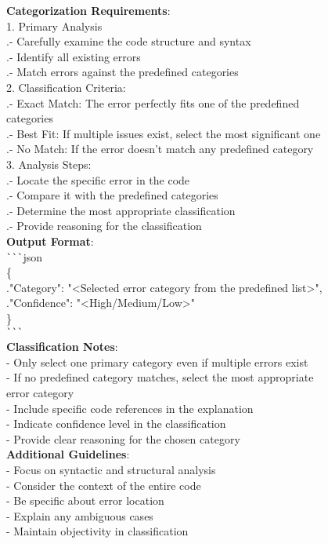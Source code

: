\documentclass[11pt, a4paper, logo, copyright, nonumbering, amsart]{map}
\begin{document}
\begin{CJK*}{UTF8}{gbsn}
\begin{figure*}[h!]
\begin{center}
\begin{tcolorbox}[width=1\textwidth, colback=lightblue, title={\textbf{Identifying Programming Error Types Prompt}}]
    \textbf{Categorization Requirements}:\\
    1. Primary Analysis\\
       .\quad- Carefully examine the code structure and syntax\\
       .\quad- Identify all existing errors\\
       .\quad- Match errors against the predefined categories\\
    2. Classification Criteria:\\
       .\quad- Exact Match: The error perfectly fits one of the predefined categories\\
       .\quad- Best Fit: If multiple issues exist, select the most significant one\\
       .\quad- No Match: If the error doesn't match any predefined category\\
    3. Analysis Steps:\\
       .\quad- Locate the specific error in the code\\
       .\quad- Compare it with the predefined categories\\
       .\quad- Determine the most appropriate classification\\
       .\quad- Provide reasoning for the classification\\
    
    \textbf{Output Format}:\\
    \verb|```|json\\
    \{\\
      .\quad"Category": "<Selected error category from the predefined list>",\\
      .\quad"Confidence": "<High/Medium/Low>"\\
    \}\\
    \verb|```|\\
    
    \textbf{Classification Notes}:\\
    - Only select one primary category even if multiple errors exist\\
    - If no predefined category matches, select the most appropriate error category\\
    - Include specific code references in the explanation\\
    - Indicate confidence level in the classification\\
    - Provide clear reasoning for the chosen category\\
    
    \textbf{Additional Guidelines}:\\
    - Focus on syntactic and structural analysis\\
    - Consider the context of the entire code\\
    - Be specific about error location\\
    - Explain any ambiguous cases\\
    - Maintain objectivity in classification\\


\end{tcolorbox}
\end{center}
\end{figure*}
\end{CJK*}
\end{document}

